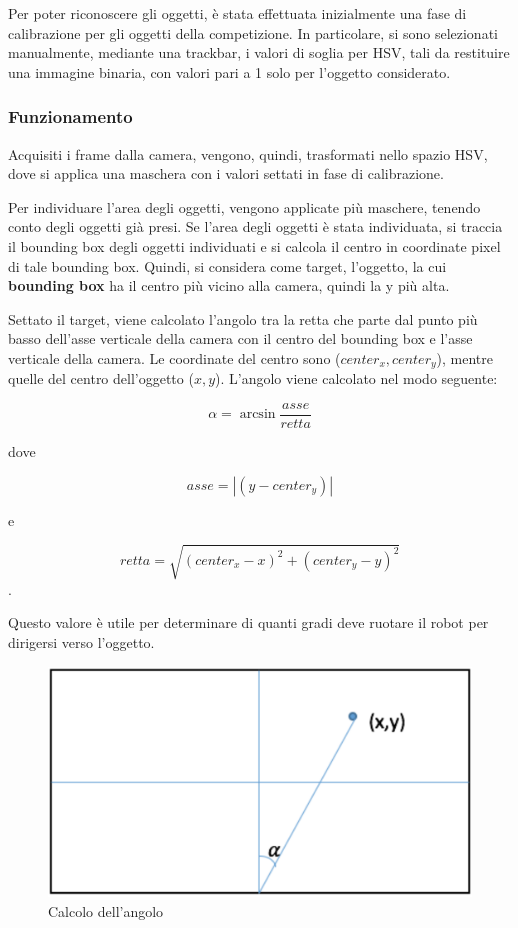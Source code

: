 \documentclass[a4paper,12pt,italian]{article}
\begin{document}
Per poter riconoscere gli oggetti, è stata effettuata inizialmente una fase di calibrazione per gli oggetti della competizione. In particolare, si sono selezionati manualmente, mediante una trackbar, i valori di soglia per HSV, tali da restituire una immagine binaria, con valori pari a 1 solo per l'oggetto considerato.

\subsubsection{Funzionamento}

Acquisiti i frame dalla camera, vengono, quindi, trasformati nello spazio HSV, dove si applica una maschera con i valori settati in fase di calibrazione. 

Per individuare l'area degli oggetti, vengono applicate più maschere, tenendo conto degli oggetti già presi. Se l'area degli oggetti è stata individuata, si traccia il bounding box degli oggetti individuati e si calcola il centro in coordinate pixel di tale bounding box. Quindi, si considera come target, l'oggetto, la cui \textbf{bounding box} ha il centro più vicino alla camera, quindi la y più alta. 

Settato il target, viene calcolato l'angolo tra la retta che parte dal punto più basso dell'asse verticale della camera con il centro del bounding box e l'asse verticale della camera.
Le coordinate del centro sono ($center_x, center_y$), mentre quelle del centro dell'oggetto ($x, y$).
L'angolo viene calcolato nel modo seguente:

$$\alpha = \arcsin{\frac{asse}{retta}}$$

dove 

$$asse = |{(y - center_y)}|$$

e

$$retta = \sqrt{(center_x - x)^2 + (center_y - y)^2}$$.

Questo valore è utile per determinare di quanti gradi deve ruotare il robot per dirigersi verso l'oggetto.

\begin{figure}[H]
	\begin{center}
	\includegraphics[scale=0.5]{angle.png}
	\caption{Calcolo dell'angolo}
	\label{Fig: movimento_3}
	\end{center}
\end{figure}
\end{document}
